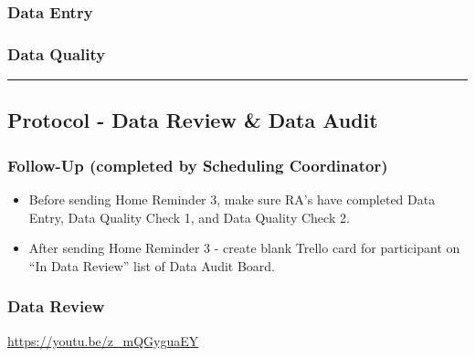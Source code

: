 \documentclass[]{book}
\providecommand{\tightlist}{%
  \setlength{\itemsep}{0pt}\setlength{\parskip}{0pt}}
\begin{document}
\hypertarget{data-entry-3}{%
\subsubsection{Data Entry}\label{data-entry-3}}

\hypertarget{data-quality-2}{%
\subsubsection{Data Quality}\label{data-quality-2}}

\begin{center}\rule{0.5\linewidth}{0.5pt}\end{center}

\hypertarget{protocol---data-review-data-audit}{%
\subsection{Protocol - Data Review \& Data Audit}\label{protocol---data-review-data-audit}}

\hypertarget{follow-up-completed-by-scheduling-coordinator-1}{%
\subsubsection{Follow-Up (completed by Scheduling Coordinator)}\label{follow-up-completed-by-scheduling-coordinator-1}}

\begin{itemize}
\tightlist
\item
  Before sending Home Reminder 3, make sure RA's have completed Data Entry, Data Quality Check 1, and Data Quality Check 2.
\item
  After sending Home Reminder 3 - create blank Trello card for participant on ``In Data Review'' list of Data Audit Board.
\end{itemize}

\hypertarget{data-review}{%
\subsubsection{Data Review}\label{data-review}}

\url{https://youtu.be/z_mQGyguaEY}
\end{document}
